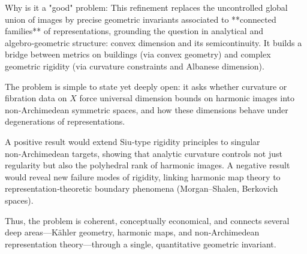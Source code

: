 Why is it a "good" problem:  
This refinement replaces the uncontrolled global union of images by precise geometric invariants associated to **connected families** of representations, grounding the question in analytical and algebro‑geometric structure: convex dimension and its semicontinuity. It builds a bridge between metrics on buildings (via convex geometry) and complex geometric rigidity (via curvature constraints and Albanese dimension).  

The problem is simple to state yet deeply open: it asks whether curvature or fibration data on \(X\) force universal dimension bounds on harmonic images into non‑Archimedean symmetric spaces, and how these dimensions behave under degenerations of representations.  

A positive result would extend Siu‑type rigidity principles to singular non‑Archimedean targets, showing that analytic curvature controls not just regularity but also the polyhedral rank of harmonic images.  
A negative result would reveal new failure modes of rigidity, linking harmonic map theory to representation‑theoretic boundary phenomena (Morgan–Shalen, Berkovich spaces).  

Thus, the problem is coherent, conceptually economical, and connects several deep areas—Kähler geometry, harmonic maps, and non‑Archimedean representation theory—through a single, quantitative geometric invariant.